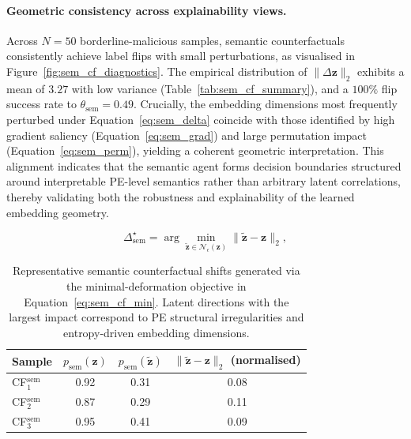 \documentclass[3p]{elsarticle}
\begin{document}
\paragraph{Geometric consistency across explainability views.}
Across $N=50$ borderline-malicious samples, semantic counterfactuals consistently achieve label flips with small perturbations, as visualised in
Figure~\ref{fig:sem_cf_diagnostics}. The empirical distribution of $\lVert \Delta \mathbf{z} \rVert_2$ exhibits a mean of $3.27$ with low variance (Table~\ref{tab:sem_cf_summary}), and a $100\%$ flip success rate to
$\theta_{\mathrm{sem}}=0.49$. Crucially, the embedding dimensions most frequently perturbed under Equation~\eqref{eq:sem_delta} coincide with those identified by high gradient saliency (Equation~\eqref{eq:sem_grad}) and large permutation impact (Equation~\eqref{eq:sem_perm}), yielding a coherent geometric interpretation. This alignment indicates that the semantic agent forms decision boundaries structured around interpretable PE-level semantics rather than arbitrary latent correlations, thereby validating both the robustness and explainability of the learned embedding geometry.



\begin{equation}
\Delta^{\star}_{\mathrm{sem}}
=
\arg\min_{\tilde{\mathbf{z}} \in \mathcal{N}_{\epsilon}(\mathbf{z})}
\|\tilde{\mathbf{z}} - \mathbf{z}\|_2 ,
\label{eq:sem_cf_min}
\end{equation}

\begin{table}[t]
\centering
\begin{tabular}{lccc}
\toprule
\textbf{Sample} &
$p_{\mathrm{sem}}(\mathbf{z})$ &
$p_{\mathrm{sem}}(\tilde{\mathbf{z}})$ &
$\|\tilde{\mathbf{z}}-\mathbf{z}\|_2$ (normalised) \\
\midrule
CF$^\mathrm{sem}_1$ & 0.92 & 0.31 & 0.08 \\
CF$^\mathrm{sem}_2$ & 0.87 & 0.29 & 0.11 \\
CF$^\mathrm{sem}_3$ & 0.95 & 0.41 & 0.09 \\
\bottomrule
\end{tabular}
\caption{Representative semantic counterfactual shifts generated via the minimal-deformation objective in Equation~\eqref{eq:sem_cf_min}. Latent directions with the largest impact correspond to PE structural irregularities and entropy-driven embedding dimensions.}
\label{tab:sem_cf}
\end{table}
\end{document}
